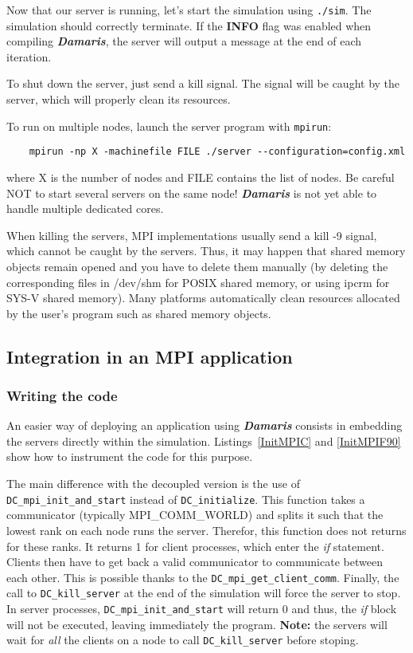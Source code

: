 \documentclass[11pt]{report}
\newcommand{\Damaris}{\emph{\textbf{Damaris}}}
\newcommand{\function}[1]{\texttt{#1}}
\begin{document}
Now that our server is running, let's start the simulation using \texttt{./sim}. The simulation should correctly terminate. If the \textbf{INFO} flag was enabled when compiling \Damaris{}, the server will output a message
at the end of each iteration.

To shut down the server, just send a kill signal. The signal will be caught by the server, which will
properly clean its resources.

To run on multiple nodes, launch the server program with \texttt{mpirun}:
\begin{verbatim}
	mpirun -np X -machinefile FILE ./server --configuration=config.xml
\end{verbatim}
where X is the number of nodes and FILE contains the list of nodes. Be careful NOT to start several servers
on the same node! \Damaris{} is not yet able to handle multiple dedicated cores.

When killing the servers, MPI implementations usually send a kill -9 signal, which cannot be caught by
the servers. Thus, it may happen that shared memory objects remain opened and you have to delete them
manually (by deleting the corresponding files in /dev/shm for POSIX shared memory, or using ipcrm for
SYS-V shared memory). Many platforms automatically clean resources allocated by the user's program
such as shared memory objects.

\clearpage
\subsection{Integration in an MPI application}

\subsubsection{Writing the code}

An easier way of deploying an application using \Damaris{} consists in embedding the servers
directly within the simulation. Listings~\ref{InitMPIC} and \ref{InitMPIF90} show how to instrument
the code for this purpose.

The main difference with the decoupled version is the use of \function{DC\_mpi\_init\_and\_start} instead of
\function{DC\_initialize}. This function takes a communicator (typically MPI\_COMM\_WORLD)
and splits it such that the lowest rank on each node runs the server. Therefor, this
function does not returns for these ranks. It returns 1 for client processes, which enter the \emph{if}
statement. Clients then have to get back a valid communicator to communicate between each other.
This is possible thanks to the \function{DC\_mpi\_get\_client\_comm}.
Finally, the call to \function{DC\_kill\_server} at the end of the simulation will force the server to stop.
In server processes, \function{DC\_mpi\_init\_and\_start} will return 0 and thus, the \emph{if} block will not
be executed, leaving immediately the program.
\textbf{Note:} the servers will wait for \emph{all} the clients on a node to call \function{DC\_kill\_server} 
before stoping.
\end{document}
